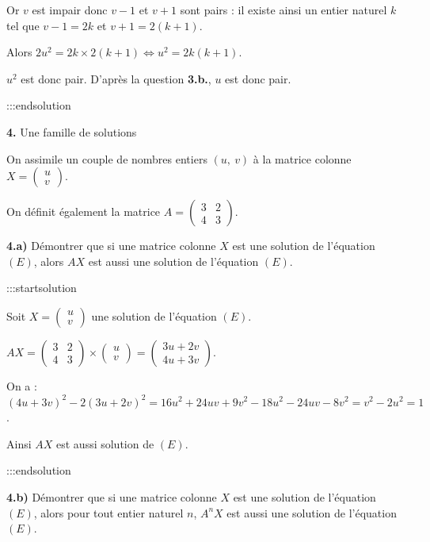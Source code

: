 \documentclass[12pt]{cornouaille}
\begin{document}
Or $v$ est impair donc $v-1$ et  $v+1$ sont pairs : il existe ainsi un
entier naturel $k$ tel que $v-1=2k$ et $v+1=2(k+1)$.

Alors $2u^2=2k \times 2(k+1) \iff u^2=2k(k+1)$.

$u^2$ est donc pair. D'après la question \textbf{3.b.}, $u$ est donc pair.


:::endsolution




\textbf{4. }  Une famille de solutions

On assimile un couple de nombres entiers $(u,~v)$ à la matrice colonne $X = 
\begin{pmatrix}u\\v\end{pmatrix}
$.

On définit également la matrice $A = 
\begin{pmatrix}3&2\\4&3\end{pmatrix}
$.




\textbf{4.a) } Démontrer que si une matrice colonne $X$ est une solution de l'équation $(E)$, alors $AX$ est aussi une solution de l'équation $(E)$.


:::startsolution

Soit $X=
\begin{pmatrix}		u\\v		\end{pmatrix}
$ une solution de l'équation $(E)$.

$AX=
\begin{pmatrix} 3&2\\ 4&3 \end{pmatrix}
 \times 
\begin{pmatrix} u\\ v
\end{pmatrix}
=
\begin{pmatrix} 3u+2v\\ 4u+3v\end{pmatrix}
$.

On a : $(4u+3v)^2-2(3u+2v)^2=16u^2+24uv+9v^2-18u^2-24uv-8v^2=v^2-2u^2=1$.

Ainsi $AX$ est aussi solution de $(E)$.


:::endsolution


\textbf{4.b) } Démontrer que si une matrice colonne $X$ est une solution de l'équation $(E)$, alors pour tout entier naturel $n$,\: $A^n X$ est aussi une solution de l'équation $(E)$.
\end{document}
